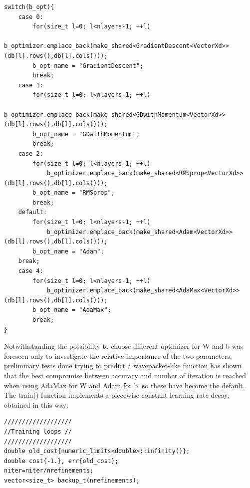 \documentclass[12pt, a4paper]{report}
\theoremstyle{definition}
\begin{document}
{\begin{lstlisting}[frame=single]
switch(b_opt){
	case 0:
		for(size_t l=0; l<nlayers-1; ++l)
			b_optimizer.emplace_back(make_shared<GradientDescent<VectorXd>>(db[l].rows(),db[l].cols()));
		b_opt_name = "GradientDescent";
		break;
	case 1:
		for(size_t l=0; l<nlayers-1; ++l)
			b_optimizer.emplace_back(make_shared<GDwithMomentum<VectorXd>>(db[l].rows(),db[l].cols()));
		b_opt_name = "GDwithMomentum";
		break;
	case 2:
		for(size_t l=0; l<nlayers-1; ++l)
			b_optimizer.emplace_back(make_shared<RMSprop<VectorXd>>(db[l].rows(),db[l].cols()));
		b_opt_name = "RMSprop";
		break;
	default:
		for(size_t l=0; l<nlayers-1; ++l)
			b_optimizer.emplace_back(make_shared<Adam<VectorXd>>(db[l].rows(),db[l].cols()));
		b_opt_name = "Adam";
	break;
	case 4:
		for(size_t l=0; l<nlayers-1; ++l)
			b_optimizer.emplace_back(make_shared<AdaMax<VectorXd>>(db[l].rows(),db[l].cols()));
		b_opt_name = "AdaMax";
		break;
}	
\end{lstlisting}
Notwithstanding the possibility to choose different optimizer for {\ttfamily W} and {\ttfamily b} was foreseen only to investigate the relative importance of the two parameters, preliminary tests done trying to predict a wavepacket-like function has shown that the best compromise between accuracy and number of iteration is reached when using AdaMax for {\ttfamily W} and Adam for {\ttfamily b}, so these have become the default.\\
The {\ttfamily train()} function implements a piecewise constant learning rate decay, obtained in this way:
\begin{lstlisting}[frame=single]
///////////////////
//Training loops //
///////////////////
double old_cost{numeric_limits<double>::infinity()};
double cost{-1.}, err{old_cost};
niter=niter/nrefinements;
vector<size_t> backup_t(nrefinements);
	

\end{lstlisting}}
\end{document}
